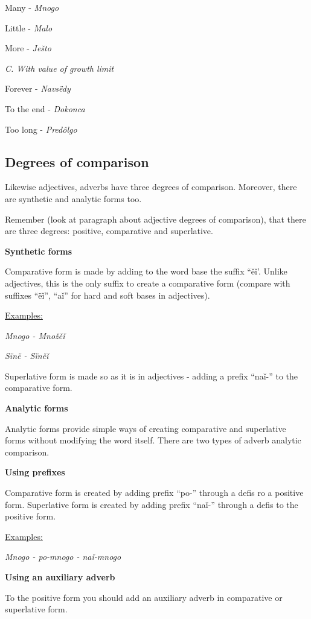Many - \textit{Mnogo}

Little - \textit{Malo}

More - \textit{Ješto}

\textit{C. With value of growth limit}

Forever - \textit{Navsëdy}

To the end - \textit{Dokonca}

Too long - \textit{Predôlgo}

\subsection{Degrees of comparison}

Likewise adjectives, adverbs have three degrees of comparison. Moreover, there are synthetic and analytic forms too. 

Remember (look at paragraph about adjective degrees of comparison), that there are three degrees: positive, comparative and superlative.

\textbf{Synthetic forms}

Comparative form is made by adding to the word base the suffix “ěǐ’. Unlike adjectives, this is the only suffix to create a comparative form (compare with suffixes “ëǐ”, “aǐ” for hard and soft bases in adjectives). 

\underline{Examples:}

\textit{Mnogo - Množěǐ}

\textit{Sïnë - Sïněǐ}

Superlative form is made so as it is in adjectives - adding a prefix “naǐ-” to the comparative form.

\textbf{Analytic forms}

Analytic forms provide simple ways of creating comparative and superlative forms without modifying the word itself. There are two types of adverb analytic comparison.

\textbf{Using prefixes}

Comparative form is created by adding prefix “po-” through a defis ro a positive form. Superlative form is created by adding prefix “naǐ-” through a defis to the positive form.

\underline{Examples:}

\textit{Mnogo - po-mnogo - naǐ-mnogo}

\textbf{Using an auxiliary adverb}

To the positive form you should add an auxiliary adverb in comparative or superlative form.

